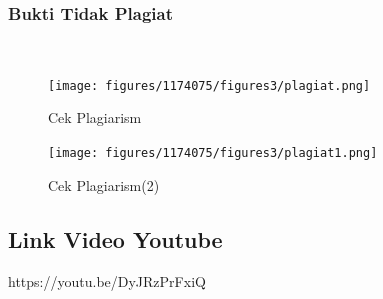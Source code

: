 \subsubsection{Bukti Tidak Plagiat}
\hfill\\
\begin{figure}[H]
	\centering
	\texttt{[image: figures/1174075/figures3/plagiat.png]}
	\caption{Cek Plagiarism}
\end{figure}
\begin{figure}[H]
	\centering
	\texttt{[image: figures/1174075/figures3/plagiat1.png]}	
	\caption{Cek Plagiarism(2)}
\end{figure}


\subsection{Link Video Youtube}
https://youtu.be/DyJRzPrFxiQ